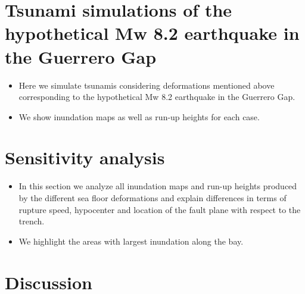 \documentclass[preprint,review,12pt]{elsarticle}
\begin{document}
\section{Tsunami simulations of the hypothetical Mw 8.2 earthquake in the Guerrero Gap} \label{sec:guerrero_gap}
\begin{itemize}
  \item Here we simulate tsunamis considering deformations mentioned above corresponding to the  hypothetical Mw 8.2 earthquake in the Guerrero Gap. 
  \item We show inundation maps as well as run-up heights for each case.
\end{itemize}

\section{Sensitivity analysis} \label{sec:sensitivity}

\begin{itemize}
  \item  In this section we analyze all inundation maps and run-up heights produced by the different sea floor deformations and explain differences in terms of rupture speed, hypocenter and location of the fault plane with respect to the trench. 
 \item We highlight the areas with largest inundation along the bay.
\end{itemize}

\section{Discussion} \label{sec:discussion}
\end{document}
